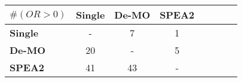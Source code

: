 \begin{tabular}{ l | c c c c c c c}
\hline 
\textbf{$\#(OR > 0)$}&\textbf{Single}&\textbf{De-MO}&\textbf{SPEA2} \\ 
\hline 
\textbf{Single}&-&7&1\\ 
\textbf{De-MO}&20&-&5\\ 
\textbf{SPEA2}&41&43&-\\ 
\hline
\end{tabular} 